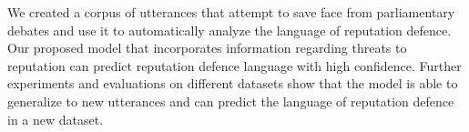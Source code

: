 We created a corpus of utterances that attempt to save face from parliamentary debates and use it to automatically analyze the language of reputation defence.  Our proposed model that incorporates information regarding threats to reputation  can predict reputation defence language with high confidence. Further experiments and evaluations on different datasets show that the model is able to generalize  to new utterances and can predict the language of reputation defence in a new dataset.
